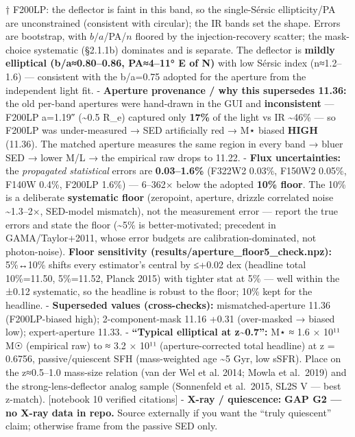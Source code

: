 \documentclass[
]{article}
\newcommand{\BreakablePath}[1]{{\ttfamily\sloppy #1}}
\begin{document}
† F200LP: the deflector is faint in this band, so the single-Sérsic
ellipticity/PA are unconstrained (consistent with circular); the IR
bands set the shape. Errors are bootstrap, with \(b/a\)/PA/\(n\) floored
by the injection-recovery scatter; the mask-choice systematic (§2.1.1b)
dominates and is separate. The deflector is \textbf{mildly elliptical
(b/a≈0.80--0.86, PA≈4--11° E of N)} with low Sérsic index (n≈1.2--1.6)
--- consistent with the b/a=0.75 adopted for the aperture from the
independent light fit. - \textbf{Aperture provenance / why this
supersedes 11.36:} the old per-band apertures were hand-drawn in the GUI
and \textbf{inconsistent} --- F200LP a=1.19″ (\textasciitilde0.5 R\_e)
captured only \textbf{17\%} of the light vs IR \textasciitilde46\% ---
so F200LP was under-measured → SED artificially red → M⋆ biased
\textbf{HIGH} (11.36). The matched aperture measures the same region in
every band → bluer SED → lower M/L → the empirical raw drops to 11.22. -
\textbf{Flux uncertainties:} the \emph{propagated statistical} errors
are \textbf{0.03--1.6\%} (F322W2 0.03\%, F150W2 0.05\%, F140W 0.4\%,
F200LP 1.6\%) --- 6--362× below the adopted \textbf{10\% floor}. The
10\% is a deliberate \textbf{systematic floor} (zeropoint, aperture,
drizzle correlated noise \textasciitilde1.3--2×, SED-model mismatch),
not the measurement error --- report the true errors and state the floor
(\textasciitilde5\% is better-motivated; precedent in GAMA/Taylor+2011,
whose error budgets are calibration-dominated, not photon-noise).
\textbf{Floor sensitivity
(\BreakablePath{results/\discretionary{}{}{}aperture\_\discretionary{}{}{}floor5\_\discretionary{}{}{}check.\discretionary{}{}{}npz}):}
5\%↔10\% shifts every estimator's central by ≤+0.02 dex (headline total
10\%=11.50, 5\%=11.52, Planck 2015) with tighter stat at 5\% --- well
within the ±0.12 systematic, so the headline is robust to the floor;
10\% kept for the headline. - \textbf{Superseded values (cross-checks):}
mismatched-aperture 11.36 (F200LP-biased high); 2-component-mask 11.16
+0.31 (over-masked → biased low); expert-aperture 11.33. -
\textbf{``Typical elliptical at z\textasciitilde0.7'':} M⋆ ≈ 1.6 × 10¹¹
M☉ (empirical raw) to ≈ 3.2 × 10¹¹ (aperture-corrected total headline)
at z = 0.6756, passive/quiescent SFH (mass-weighted age \textasciitilde5
Gyr, low sSFR). Place on the z≈0.5--1.0 mass-size relation (van der Wel
et al. 2014; Mowla et al.~2019) and the strong-lens-deflector analog
sample (Sonnenfeld et al.~2015, SL2S V --- best z-match). {[}notebook 10
verified citations{]} - \textbf{X-ray / quiescence:} \textbf{GAP G2 ---
no X-ray data in repo.} Source externally if you want the ``truly
quiescent'' claim; otherwise frame from the passive SED only.
\end{document}
